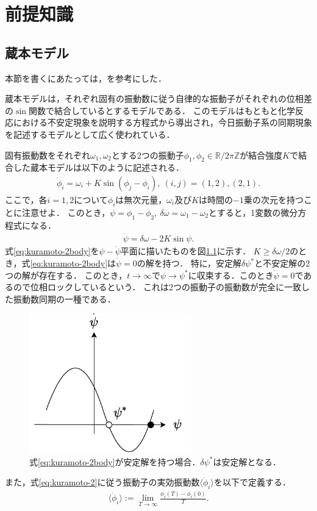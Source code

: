 \documentclass[../main]{subfiles}
\begin{document}
\chapter{前提知識}
\label{chap:prev}
\section{蔵本モデル}
本節を書くにあたっては，\cite{RODRIGUES20161,biorhythm}を参考にした．

蔵本モデルは，それぞれ固有の振動数に従う自律的な振動子がそれぞれの位相差の$\sin$関数で結合しているとするモデルである．
このモデルはもともと化学反応における不安定現象を説明する方程式から導出され\cite{kuramoto1975}，今日振動子系の同期現象を記述するモデルとして広く使われている．

固有振動数をそれぞれ$\omega_1,\omega_2$とする2つの振動子$\phi_1,\phi_2\in\mathbb{R}/2\pi\mathbb{Z}$が結合強度$K$で結合した蔵本モデルは以下のように記述される．
\begin{align}
    \label{eq:kuramoto-2}
    \dot{\phi}_i=\omega_i+K\sin(\phi_j-\phi_i),\ (i,j)=(1,2),(2,1).
\end{align}
ここで，各$i=1,2$について$\phi_i$は無次元量，$\omega_i$及び$K$は時間の$-1$乗の次元を持つことに注意せよ．
このとき，$\psi=\phi_1-\phi_2,\ \delta\omega=\omega_1-\omega_2$とすると，1変数の微分方程式になる．
\begin{align}
    \label{eq:kuramoto-2body}
    \dot{\psi}=\delta\omega-2K\sin\psi.  
\end{align}
式\eqref{eq:kuramoto-2body}を$\psi-\dot{\psi}$平面に描いたものを図\ref{fig:kuramoto-2}に示す．
$K\geq\delta\omega/2$のとき，式\eqref{eq:kuramoto-2body}は$\dot{\psi}=0$の解を持つ．
特に，安定解$\delta\psi^\ast$と不安定解の2つの解が存在する．
このとき，$t\to\infty$で$\psi\to\psi^\ast$に収束する．このとき$\dot{\psi}=0$であるので位相ロックしているという．
これは2つの振動子の振動数が完全に一致した振動数同期の一種である．
\begin{figure}[tbp]
\centering
\includegraphics[width=70mm]{images/kuramoto-2.pdf}
\centering
\caption{式\eqref{eq:kuramoto-2body}が安定解を持つ場合．$\delta\psi^\ast$は安定解となる．}
\label{fig:kuramoto-2}
\end{figure}
また，式\eqref{eq:kuramoto-2}に従う振動子の実効振動数$\langle\dot{\phi}_i\rangle$を以下で定義する．
\begin{align}
    \langle\dot{\phi}_i\rangle:=\lim_{T\to\infty}\frac{\phi_i(T)-\phi_i(0)}{T}.
\end{align}
\end{document}
